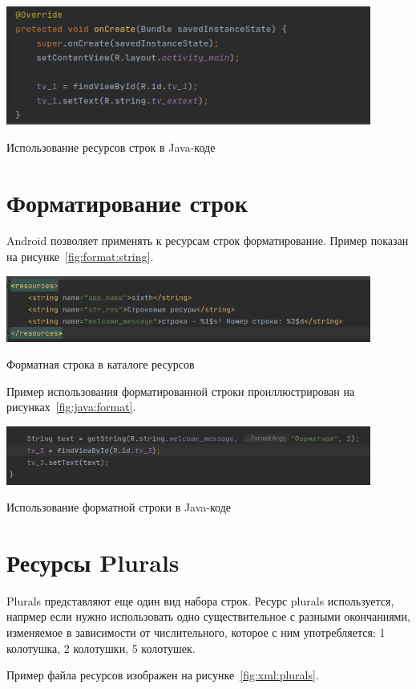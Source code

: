 \begin{image}
	\includegraphics[width=0.9\textwidth]{Screenshot from 2023-03-28 15-30-24}
	\caption{Использование ресурсов строк в Java-коде}
	\label{fig:java:string}
\end{image}

\section{Форматирование строк}
Android позволяет применять к ресурсам строк форматирование. Пример
показан на рисунке~\ref{fig:format:string}.

\begin{image}
	\includegraphics[width=0.9\textwidth]{Screenshot from 2023-03-28 15-40-34}
	\caption{Форматная строка в каталоге ресурсов}
	\label{fig:format:string}
\end{image}

Пример использования форматированной строки проиллюстрирован
на рисунках~\ref{fig:java:format}.

\begin{image}
	\includegraphics[width=0.9\textwidth]{Screenshot from 2023-03-28 15-44-46}
	\caption{Использование форматной строки в Java-коде}
	\label{fig:java:format}
\end{image}

\section{Ресурсы Plurals}
Plurals представляют еще один вид набора строк.
Ресурс plurals используется, напрмер если нужно использовать одно
существительное с разными окончаниями, изменяемое в зависимости от
числительного, которое с ним употребляется: 1 колотушка, 2 колотушки,
5 колотушек.\par
Пример файла ресурсов изображен на рисунке~\ref{fig:xml:plurals}.


